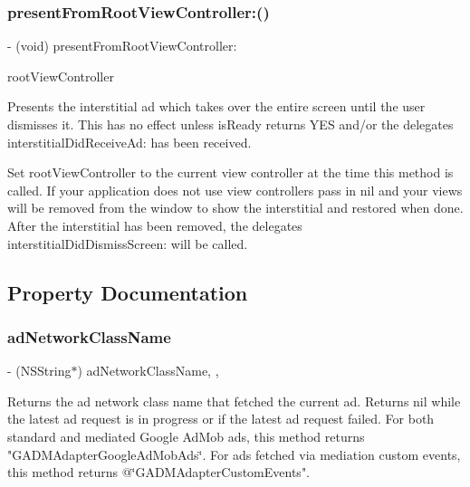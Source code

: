 \subsubsection{\texorpdfstring{present\+From\+Root\+View\+Controller\+:()}{presentFromRootViewController:()}}
{\footnotesize\ttfamily -\/ (void) present\+From\+Root\+View\+Controller\+: \begin{DoxyParamCaption}\item[{(U\+I\+View\+Controller $\ast$)}]{root\+View\+Controller }\end{DoxyParamCaption}}

Presents the interstitial ad which takes over the entire screen until the user dismisses it. This has no effect unless is\+Ready returns Y\+ES and/or the delegate\textquotesingle{}s interstitial\+Did\+Receive\+Ad\+: has been received.

Set root\+View\+Controller to the current view controller at the time this method is called. If your application does not use view controllers pass in nil and your views will be removed from the window to show the interstitial and restored when done. After the interstitial has been removed, the delegate\textquotesingle{}s interstitial\+Did\+Dismiss\+Screen\+: will be called. 

\subsection{Property Documentation}
\mbox{\label{interfaceGADInterstitial_a15863b00745b472e5683e50a97268431}} 
\subsubsection{\texorpdfstring{ad\+Network\+Class\+Name}{adNetworkClassName}}
{\footnotesize\ttfamily -\/ (N\+S\+String$\ast$) ad\+Network\+Class\+Name\hspace{0.3cm}{\ttfamily [read]}, {\ttfamily [nonatomic]}, {\ttfamily [copy]}}

Returns the ad network class name that fetched the current ad. Returns nil while the latest ad request is in progress or if the latest ad request failed. For both standard and mediated Google Ad\+Mob ads, this method returns "G\+A\+D\+M\+Adapter\+Google\+Ad\+Mob\+Ads\char`\"{}. For ads fetched via mediation
custom events, this method returns @\char`\"{}G\+A\+D\+M\+Adapter\+Custom\+Events". \mbox{\label{interfaceGADInterstitial_a73457abf83692509057ec285b4315836}} 
